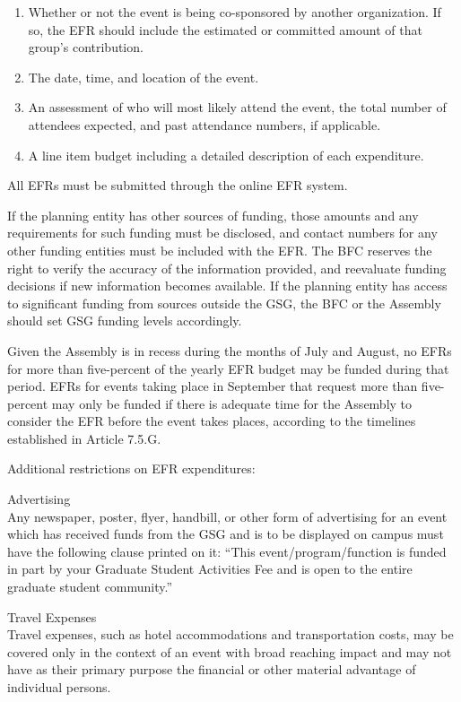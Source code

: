 \begin{bylaws-number}
\begin{bylaws-number}
\begin{enumerate}[i]
  \item Whether or not the event is being co-sponsored by another organization. If so, the EFR should include the estimated or committed amount of that group’s contribution.
  \item The date, time, and location of the event.
  \item An assessment of who will most likely attend the event, the total number of attendees expected, and past attendance numbers, if applicable.
  \item A line item budget including a detailed description of each expenditure.
\end{enumerate}
  \item All EFRs must be submitted through the online EFR system.
  \item If the planning entity has other sources of funding, those amounts and any requirements for such funding must be disclosed, and contact numbers for any other funding entities must be included with the EFR. The BFC reserves the right to verify the accuracy of the information provided, and reevaluate funding decisions if new information becomes available. If the planning entity has access to significant funding from sources outside the GSG, the BFC or the Assembly should set GSG funding levels accordingly.
  \item Given the Assembly is in recess during the months of July and August, no EFRs for more than five-percent of the yearly EFR budget may be funded during that period. EFRs for events taking place in September that request more than five-percent may only be funded if there is adequate time for the Assembly to consider the EFR before the event takes places, according to the timelines established in Article 7.5.G.
\end{bylaws-number}
  \item Additional restrictions on EFR expenditures:
\begin{bylaws-number}
  \item Advertising \hfill \\
Any newspaper, poster, flyer, handbill, or other form of advertising for an event which has received funds from the GSG and is to be displayed on campus must have the following clause printed on it: “This event/program/function is funded in part by your Graduate Student Activities Fee and is open to the entire graduate student community.”
  \item Travel Expenses \hfill \\
Travel expenses, such as hotel accommodations and transportation costs, may be covered only in the context of an event with broad reaching impact and may not have as their primary purpose the financial or other material advantage of individual persons.

\end{bylaws-number}
\end{bylaws-number}
